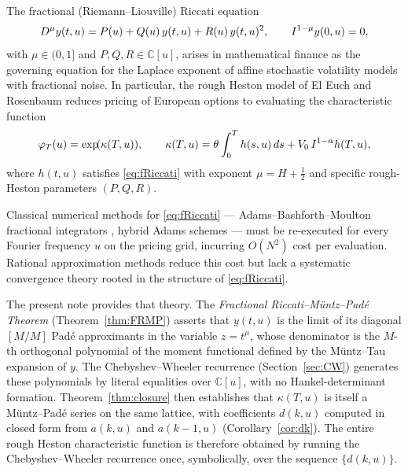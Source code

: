 \documentclass{article}
\newcommand{\tmem}[1]{{\em #1\/}}
\newcommand{\C}{\mathbb{C}}
\begin{document}
The fractional (Riemann--Liouville) Riccati equation
\begin{equation}
  D^{\mu} y (t, u) = P (u) + Q (u)  \hspace{0.17em} y (t, u) + R (u) 
  \hspace{0.17em} y (t, u)^2, \qquad I^{1 - \mu} y (0, u) = 0,
  \label{eq:fRiccati}
\end{equation}
with $\mu \in (0, 1]$ and $P, Q, R \in \C [u]$, arises in mathematical finance
as the governing equation for the Laplace exponent of affine stochastic
volatility models with fractional noise. In particular, the rough Heston model
of El Euch and Rosenbaum {\cite{ElEuchRosenbaum2019}} reduces pricing of
European options to evaluating the characteristic function
\begin{equation}
  \varphi_T (u) = \exp \hspace{-0.17em} (\kappa (T, u)), \qquad \kappa (T, u)
  = \theta \int_0^T h (s, u)  \hspace{0.17em} ds + V_0  \hspace{0.17em} I^{1 -
  \alpha} h (T, u), \label{eq:phiT}
\end{equation}
where $h (t, u)$ satisfies \eqref{eq:fRiccati} with exponent $\mu = H +
\tfrac{1}{2}$ and specific rough-Heston parameters $(P, Q, R)$.

Classical numerical methods for \eqref{eq:fRiccati} ---
Adams--Bashforth--Moulton fractional integrators {\cite{Diethelm2004}}, hybrid
Adams schemes {\cite{GatheralRadoicic2019}} --- must be re-executed for every
Fourier frequency $u$ on the pricing grid, incurring $O (N^2)$ cost per
evaluation. Rational approximation methods
{\cite{GatheralRadoicic2019,AbiJaberElEuch2019}} reduce this cost but lack a
systematic convergence theory rooted in the structure of \eqref{eq:fRiccati}.

The present note provides that theory. The {\tmem{Fractional
Riccati--M{\"u}ntz--Pad{\'e} Theorem}} (Theorem~\ref{thm:FRMP}) asserts that
$y (t, u)$ is the limit of its diagonal $[M / M]$ Pad{\'e} approximants in the
variable $z = t^{\mu}$, whose denominator is the $M$-th orthogonal polynomial
of the moment functional defined by the M{\"u}ntz--Tau expansion of $y$. The
Chebyshev--Wheeler recurrence (Section~\ref{sec:CW}) generates these
polynomials by literal equalities over $\C [u]$, with no Hankel-determinant
formation.  Theorem~\ref{thm:closure} then establishes that $\kappa (T, u)$ is
itself a M{\"u}ntz--Pad{\'e} series on the same lattice, with coefficients $d
(k, u)$ computed in closed form from $a (k, u)$ and $a (k - 1, u)$
(Corollary~\ref{cor:dk}). The entire rough Heston characteristic function is
therefore obtained by running the Chebyshev--Wheeler recurrence once,
symbolically, over the sequence $\{d (k, u)\}$.
\end{document}
